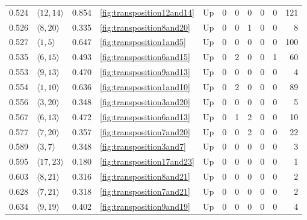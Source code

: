 \documentclass{article}
\begin{document}
\begin{center}
\begin{tabular}{lllllrrrrrr}
\cline{1-11} \cline{2-11} \cline{3-11} \cline{4-11}
0.524 & $\langle12, 14\rangle$ & 0.854 & \ref{fig:transposition12and14} & Up & 0 & 0 & 0 & 0 & 0 & 121 \\
\cline{1-11} \cline{2-11} \cline{3-11} \cline{4-11}
0.526 & $\langle8, 20\rangle$ & 0.335 & \ref{fig:transposition8and20} & Up & 0 & 0 & 1 & 0 & 0 & 8 \\
\cline{1-11} \cline{2-11} \cline{3-11} \cline{4-11}
0.527 & $\langle1, 5\rangle$ & 0.647 & \ref{fig:transposition1and5} & Up & 0 & 0 & 0 & 0 & 0 & 100 \\
\cline{1-11} \cline{2-11} \cline{3-11} \cline{4-11}
0.535 & $\langle6, 15\rangle$ & 0.493 & \ref{fig:transposition6and15} & Up & 0 & 2 & 0 & 0 & 1 & 60 \\
\cline{1-11} \cline{2-11} \cline{3-11} \cline{4-11}
0.553 & $\langle9, 13\rangle$ & 0.470 & \ref{fig:transposition9and13} & Up & 0 & 0 & 0 & 0 & 0 & 4 \\
\cline{1-11} \cline{2-11} \cline{3-11} \cline{4-11}
0.554 & $\langle1, 10\rangle$ & 0.636 & \ref{fig:transposition1and10} & Up & 0 & 2 & 0 & 0 & 0 & 89 \\
\cline{1-11} \cline{2-11} \cline{3-11} \cline{4-11}
0.556 & $\langle3, 20\rangle$ & 0.348 & \ref{fig:transposition3and20} & Up & 0 & 0 & 0 & 0 & 0 & 5 \\
\cline{1-11} \cline{2-11} \cline{3-11} \cline{4-11}
0.567 & $\langle6, 13\rangle$ & 0.472 & \ref{fig:transposition6and13} & Up & 0 & 1 & 2 & 0 & 0 & 10 \\
\cline{1-11} \cline{2-11} \cline{3-11} \cline{4-11}
0.577 & $\langle7, 20\rangle$ & 0.357 & \ref{fig:transposition7and20} & Up & 0 & 0 & 2 & 0 & 0 & 22 \\
\cline{1-11} \cline{2-11} \cline{3-11} \cline{4-11}
0.589 & $\langle3, 7\rangle$ & 0.348 & \ref{fig:transposition3and7} & Up & 0 & 0 & 0 & 0 & 0 & 3 \\
\cline{1-11} \cline{2-11} \cline{3-11} \cline{4-11}
0.595 & $\langle17, 23\rangle$ & 0.180 & \ref{fig:transposition17and23} & Up & 0 & 0 & 0 & 0 & 0 & 1 \\
\cline{1-11} \cline{2-11} \cline{3-11} \cline{4-11}
0.603 & $\langle8, 21\rangle$ & 0.316 & \ref{fig:transposition8and21} & Up & 0 & 0 & 0 & 0 & 0 & 2 \\
\cline{1-11} \cline{2-11} \cline{3-11} \cline{4-11}
0.628 & $\langle7, 21\rangle$ & 0.318 & \ref{fig:transposition7and21} & Up & 0 & 0 & 0 & 0 & 0 & 2 \\
\cline{1-11} \cline{2-11} \cline{3-11} \cline{4-11}
0.634 & $\langle9, 19\rangle$ & 0.402 & \ref{fig:transposition9and19} & Up & 0 & 0 & 0 & 0 & 0 & 4 \\

\end{tabular}
\end{center}
\end{document}
